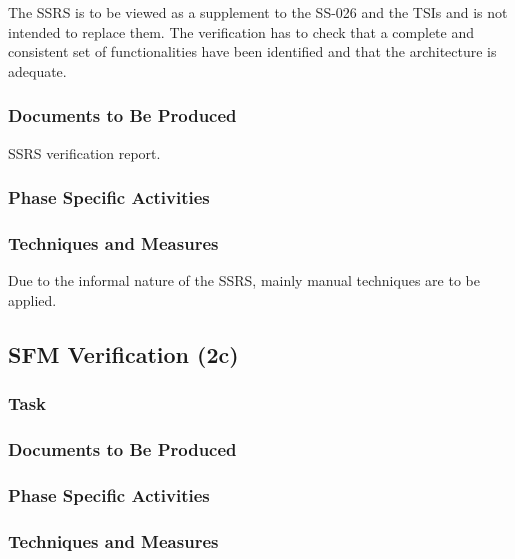 The SSRS is to be viewed as a supplement to the SS-026 and the
TSIs and is not intended to replace them. The verification has to
check that a complete and consistent set of functionalities have been
identified and that the architecture is adequate. 



\subsubsection{Documents to Be Produced}
\label{sec:ssrs-verif-docum-be-prod}

SSRS verification report.

\subsubsection{Phase Specific Activities}
\label{sec:ssrs-verif-phase-spec-activ}

\subsubsection{Techniques and Measures}
\label{sec:ssrs-verif-techniques-measures}

 Due to the informal
nature of the SSRS, mainly manual techniques are to be applied.




\subsection{SFM Verification (2c)}
\label{sec:sfm-verif-verification}

\subsubsection{Task}
\label{sec:sfm-verif-task}

\subsubsection{Documents to Be Produced}
\label{sec:sfm-verif-docum-be-prod}

\subsubsection{Phase Specific Activities}
\label{sec:sfm-verif-phase-spec-activ}

\subsubsection{Techniques and Measures}
\label{sec:sfm-verif-techniques-measures}




